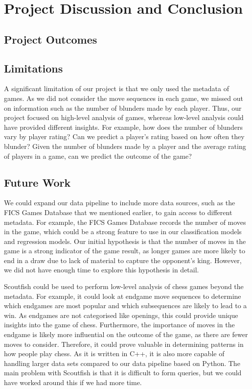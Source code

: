 \documentclass[a4paper, 11pt]{article}
\begin{document}
\section{Project Discussion and Conclusion}

\subsection{Project Outcomes}

\subsection{Limitations}
A significant limitation of our project is that we only used the metadata of games. As we did not consider the move sequences in each game, we missed out on information such as the number of blunders made by each player. Thus, our project focused on high-level analysis of games, whereas low-level analysis could have provided different insights. For example, how does the number of blunders vary by player rating? Can we predict a player's rating based on how often they blunder? Given the number of blunders made by a player and the average rating of players in a game, can we predict the outcome of the game?

\subsection{Future Work}
We could expand our data pipeline to include more data sources, such as the FICS Games Database that we mentioned earlier, to gain access to different metadata. For example, the FICS Games Database records the number of moves in the game, which could be a strong feature to use in our classification models and regression models. Our initial hypothesis is that the number of moves in the game is a strong indicator of the game result, as longer games are more likely to end in a draw due to lack of material to capture the opponent's king. However, we did not have enough time to explore this hypothesis in detail.

Scoutfish could be used to perform low-level analysis of chess games beyond the metadata. For example, it could look at endgame move sequences to determine which endgames are most popular and which subsequences are likely to lead to a win. As endgames are not categorised like openings, this could provide unique insights into the game of chess. Furthermore, the importance of moves in the endgame is likely more influential on the outcome of the game, as there are fewer moves to consider. Therefore, it could prove valuable in determining patterns in how people play chess. As it is written in C++, it is also more capable of handling larger data sets compared to our data pipeline based on Python. The main problem with Scoutfish is that it is difficult to form queries, but we could have worked around this if we had more time.
\end{document}
